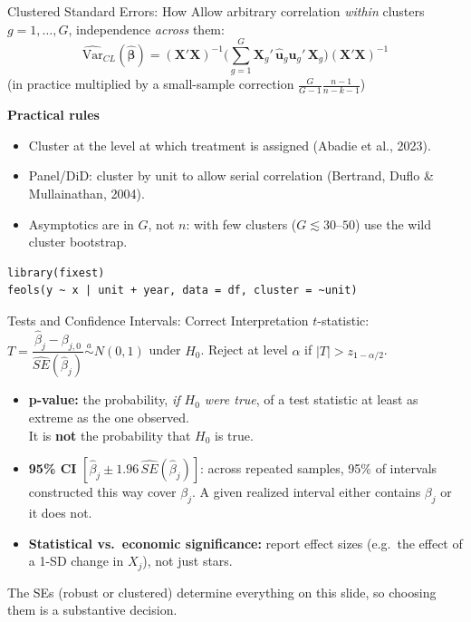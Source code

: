 \documentclass[9pt,aspectratio=169]{beamer}
\newcommand{\Var}{\mathrm{Var}}
\newcommand{\SEhat}{\widehat{SE}}
\begin{document}
\begin{frame}[fragile]{Clustered Standard Errors: How}
\linespread{1.2}\selectfont
  Allow arbitrary correlation \emph{within} clusters $g=1,\dots,G$, independence \emph{across} them:
  \[
    \widehat{\Var}_{CL}(\hat{\bm\beta})=(\bm X'\bm X)^{-1}\Big(\sum_{g=1}^{G}\bm X_g'\,\hat{\bm u}_g\hat{\bm u}_g'\,\bm X_g\Big)(\bm X'\bm X)^{-1}
  \]
  (in practice multiplied by a small-sample correction $\frac{G}{G-1}\frac{n-1}{n-k-1}$)
  \medskip

  \textbf{Practical rules}
  \begin{itemize}
    \item Cluster at the level at which treatment is assigned (Abadie et al., 2023).
    \item Panel/DiD: cluster by unit to allow serial correlation (Bertrand, Duflo \& Mullainathan, 2004).
    \item Asymptotics are in $G$, not $n$: with few clusters ($G\lesssim 30$--$50$) use the wild cluster bootstrap.
  \end{itemize}
  \begin{lstlisting}
library(fixest)
feols(y ~ x | unit + year, data = df, cluster = ~unit)
  \end{lstlisting}
\end{frame}

\begin{frame}{Tests and Confidence Intervals: Correct Interpretation}
\linespread{1.2}\selectfont
  $t$-statistic: $T=\dfrac{\hat\beta_j-\beta_{j,0}}{\SEhat(\hat\beta_j)}\overset{a}{\sim}N(0,1)$ under $H_0$. Reject at level $\alpha$ if $|T|>z_{1-\alpha/2}$.
  \medskip

  \begin{itemize}
    \item \textbf{p-value:} the probability, \emph{if $H_0$ were true}, of a test statistic at least as extreme as the one observed.\\ It is \textbf{not} the probability that $H_0$ is true.
    \item \textbf{95\% CI} $[\hat\beta_j\pm1.96\,\SEhat(\hat\beta_j)]$: across repeated samples, 95\% of intervals constructed this way cover $\beta_j$. A given realized interval either contains $\beta_j$ or it does not.
    \item \textbf{Statistical vs.\ economic significance:} report effect sizes (e.g.\ the effect of a 1-SD change in $X_j$), not just stars.
  \end{itemize}
  \medskip
  The SEs (robust or clustered) determine everything on this slide, so choosing them is a substantive decision.
\end{frame}
\end{document}
